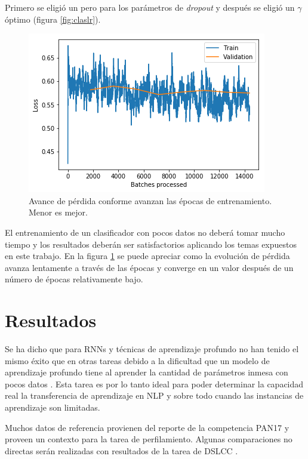 Primero se eligió un pero para los parámetros de \textit{dropout} y después se eligió un $\gamma$ óptimo (figura \ref{fig:claslr}).

\begin{figure}
\centering
\includegraphics[scale=1]{Figures/clas_epochs.png}
\caption{Avance de pérdida conforme avanzan las épocas de entrenamiento. Menor es mejor.}
\label{fig:clasepochs}
\end{figure}

El entrenamiento de un clasificador con pocos datos no deberá tomar mucho tiempo y los resultados deberán ser satisfactorios aplicando los temas expuestos en este trabajo. En la figura \ref{fig:clasepochs} se puede apreciar como la evolución de pérdida avanza lentamente a través de las épocas y converge en un valor después de un número de épocas relativamente bajo.

\section{Resultados}

Se ha dicho que para RNNs y técnicas de aprendizaje profundo no han tenido el mismo éxito que en otras tareas debido a la dificultad que un modelo de aprendizaje profundo tiene al aprender la cantidad de parámetros inmesa con pocos datos \parencite{zampieri2017, malmasi2016discriminating}. Esta tarea es por lo tanto ideal para poder determinar la capacidad real la transferencia de aprendizaje en NLP y sobre todo cuando las instancias de aprendizaje son limitadas.

Muchos datos de referencia provienen del reporte de la competencia PAN17 \parencite{rangel2017overview} y proveen un contexto para la tarea de perfilamiento. Algunas comparaciones no directas serán realizadas con resultados de la tarea de DSLCC \parencite{zampieri2017}.







